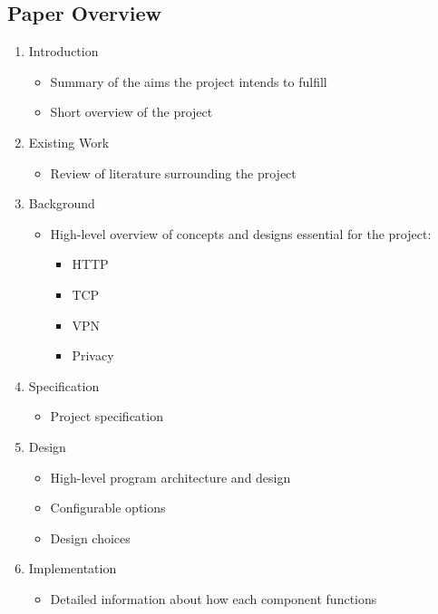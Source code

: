 \subsection{Paper Overview}
\begin{enumerate}
    \item Introduction
        \begin{itemize}
            \item Summary of the aims the project intends to fulfill
            \item Short overview of the project
        \end{itemize}
    \item Existing Work
        \begin{itemize}
            \item Review of literature surrounding the project
        \end{itemize}
    \item Background
        \begin{itemize}
            \item High-level overview of concepts and designs essential for the project:
                \begin{itemize}
                    \item HTTP
                    \item TCP
                    \item VPN
                    \item Privacy
                \end{itemize}
        \end{itemize}
    \item Specification
        \begin{itemize}
            \item Project specification
        \end{itemize}
    \item Design
        \begin{itemize}
            \item High-level program architecture and design
            \item Configurable options
            \item Design choices
        \end{itemize}
    \item Implementation
        \begin{itemize}
            \item Detailed information about how each component functions

\end{itemize}
\end{enumerate}
